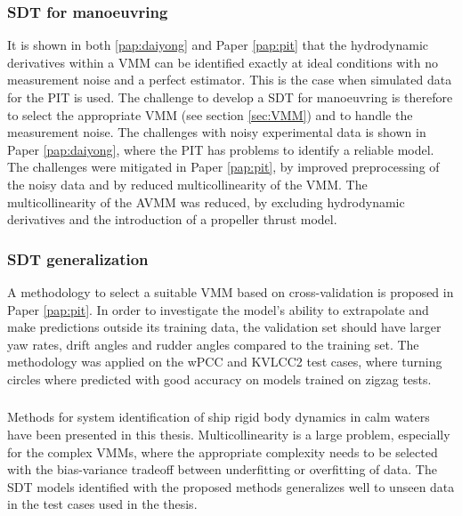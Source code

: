 \subsubsection*{SDT for manoeuvring}
It is shown in both \ref{pap:daiyong} and Paper \ref{pap:pit} that the hydrodynamic derivatives within a VMM can be identified exactly at ideal conditions with no measurement noise and a perfect estimator. This is the case when simulated data for the PIT is used.
The challenge to develop a SDT for manoeuvring is therefore to select the appropriate VMM (see section \ref{sec:VMM}) and to handle the measurement noise.
The challenges with noisy experimental data is shown in Paper \ref{pap:daiyong}, where the PIT has problems to identify a reliable model. The challenges were mitigated in Paper \ref{pap:pit}, by improved preprocessing of the noisy data and by reduced multicollinearity of the VMM. The multicollinearity of the AVMM was reduced, by excluding hydrodynamic derivatives and the introduction of a propeller thrust model.

\subsubsection*{SDT generalization}
A methodology to select a suitable VMM based on cross-validation is proposed in Paper \ref{pap:pit}. In order to investigate the model's ability to extrapolate and make predictions outside its training data, the validation set should have larger yaw rates, drift angles and rudder angles compared to the training set. The methodology was applied on the wPCC and KVLCC2 test cases, where turning circles where predicted with good accuracy on models trained on zigzag tests. 

\subsubsection*{}
Methods for system identification of ship rigid body dynamics in calm waters have been presented in this thesis. Multicollinearity is a large problem, especially for the complex VMMs, where the appropriate complexity needs to be selected with the bias-variance tradeoff between underfitting or overfitting of data. The SDT models identified with the proposed methods generalizes well to unseen data in the test cases used in the thesis.